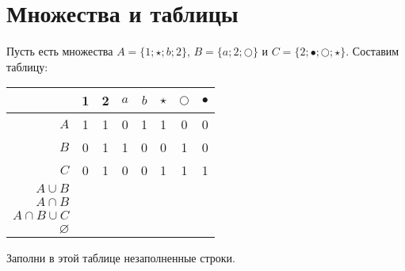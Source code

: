 \documentclass[14pt, a4paper]{extarticle}
\begin{document}
\section*{Множества и таблицы}
Пусть есть множества $A = \{1; \star; b; 2\}$, 
$B = \{a;2;\bigcirc\}$ и $C = \{2; \bullet; \bigcirc; \star\}$. Составим таблицу:

\begin{center}
    \begin{tabular}{r|c|c|c|c|c|c|c}
                   & 1 & 2 & $a$ & $b$ & $\star$ & $\bigcirc$ & $\bullet$\\
        \hline
    $A$            & 1 & 1 &  0  & 1   &   1     &  0 & 0\\
    $B$            & 0 & 1 &  1  & 0   &   0     &  1 & 0\\
    $C$            & 0 & 1 &  0  & 0   &   1     &  1 & 1\\
    $A\cup B$      &   &   &     &     &         &    &  \\
    $A\cap B$      &   &   &     &     &         &    &  \\
    $A\cap B\cup C$&   &   &     &     &         &    &  \\
    $\varnothing$  &   &   &     &     &         &    & 

    \end{tabular}
\end{center}
Заполни в этой таблице незаполненные строки.
\end{document}
